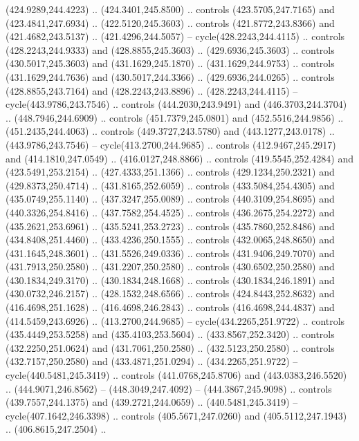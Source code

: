 \begin{scope}[cm={{1.25,0.0,0.0,-1.25,(0.0,743.43331)}}]
    (424.9289,244.4223) .. (424.3401,245.8500) .. controls (423.5705,247.7165) and
    (423.4841,247.6934) .. (422.5120,245.3603) .. controls (421.8772,243.8366) and
    (421.4682,243.5137) .. (421.4296,244.5057) -- cycle(428.2243,244.4115) ..
    controls (428.2243,244.9333) and (428.8855,245.3603) .. (429.6936,245.3603) ..
    controls (430.5017,245.3603) and (431.1629,245.1870) .. (431.1629,244.9753) ..
    controls (431.1629,244.7636) and (430.5017,244.3366) .. (429.6936,244.0265) ..
    controls (428.8855,243.7164) and (428.2243,243.8896) .. (428.2243,244.4115) --
    cycle(443.9786,243.7546) .. controls (444.2030,243.9491) and
    (446.3703,244.3704) .. (448.7946,244.6909) .. controls (451.7379,245.0801) and
    (452.5516,244.9856) .. (451.2435,244.4063) .. controls (449.3727,243.5780) and
    (443.1277,243.0178) .. (443.9786,243.7546) -- cycle(413.2700,244.9685) ..
    controls (412.9467,245.2917) and (414.1810,247.0549) .. (416.0127,248.8866) ..
    controls (419.5545,252.4284) and (423.5491,253.2154) .. (427.4333,251.1366) ..
    controls (429.1234,250.2321) and (429.8373,250.4714) .. (431.8165,252.6059) ..
    controls (433.5084,254.4305) and (435.0749,255.1140) .. (437.3247,255.0089) ..
    controls (440.3109,254.8695) and (440.3326,254.8416) .. (437.7582,254.4525) ..
    controls (436.2675,254.2272) and (435.2621,253.6961) .. (435.5241,253.2723) ..
    controls (435.7860,252.8486) and (434.8408,251.4460) .. (433.4236,250.1555) ..
    controls (432.0065,248.8650) and (431.1645,248.3601) .. (431.5526,249.0336) ..
    controls (431.9406,249.7070) and (431.7913,250.2580) .. (431.2207,250.2580) ..
    controls (430.6502,250.2580) and (430.1834,249.3170) .. (430.1834,248.1668) ..
    controls (430.1834,246.1891) and (430.0732,246.2157) .. (428.1532,248.6566) ..
    controls (424.8443,252.8632) and (416.4698,251.1628) .. (416.4698,246.2843) ..
    controls (416.4698,244.4837) and (414.5459,243.6926) .. (413.2700,244.9685) --
    cycle(434.2265,251.9722) .. controls (435.4449,253.5258) and
    (435.4103,253.5604) .. (433.8567,252.3420) .. controls (432.2250,251.0624) and
    (431.7061,250.2580) .. (432.5123,250.2580) .. controls (432.7157,250.2580) and
    (433.4871,251.0294) .. (434.2265,251.9722) -- cycle(440.5481,245.3419) ..
    controls (441.0768,245.8706) and (443.0383,246.5520) .. (444.9071,246.8562) --
    (448.3049,247.4092) -- (444.3867,245.9098) .. controls (439.7557,244.1375) and
    (439.2721,244.0659) .. (440.5481,245.3419) -- cycle(407.1642,246.3398) ..
    controls (405.5671,247.0260) and (405.5112,247.1943) .. (406.8615,247.2504) ..

\end{scope}
